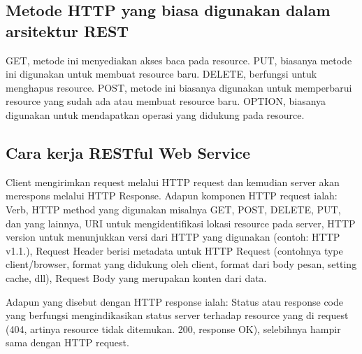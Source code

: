 \subsection{Metode HTTP yang biasa digunakan dalam arsitektur REST}
GET, metode ini menyediakan akses baca pada resource. PUT, biasanya metode ini digunakan untuk membuat resource baru. DELETE, berfungsi untuk menghapus resource. POST, metode ini biasanya digunakan untuk memperbarui resource yang sudah ada atau membuat resource baru. OPTION, biasanya digunakan untuk mendapatkan operasi yang didukung pada resource.

\subsection{Cara kerja RESTful Web Service}
Client mengirimkan request melalui HTTP request dan kemudian server akan merespons melalui HTTP Response. Adapun komponen HTTP request ialah: Verb, HTTP method yang digunakan misalnya GET, POST, DELETE, PUT, dan yang lainnya, URI untuk mengidentifikasi lokasi resource pada server, HTTP version untuk menunjukkan versi dari HTTP yang digunakan (contoh: HTTP v1.1.), Request Header berisi metadata untuk HTTP Request (contohnya type client/browser, format yang didukung oleh client, format dari body pesan, setting cache, dll), Request Body yang merupakan konten dari data.

Adapun yang disebut dengan HTTP response ialah: Status atau response code yang berfungsi mengindikasikan status server terhadap resource yang di request (404, artinya resource tidak ditemukan. 200, response OK), selebihnya hampir sama dengan HTTP request.

